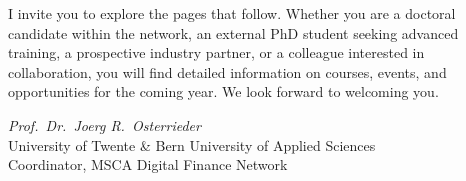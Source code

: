 I invite you to explore the pages that follow. Whether you are a doctoral candidate
within the network, an external PhD student seeking advanced training, a prospective
industry partner, or a colleague interested in collaboration, you will find detailed
information on courses, events, and opportunities for the coming year. We look forward
to welcoming you.

\vspace{12pt}

\noindent\textit{Prof.\ Dr.\ Joerg R.\ Osterrieder}\\
\noindent University of Twente \& Bern University of Applied Sciences\\
\noindent Coordinator, MSCA Digital Finance Network

\newpage
